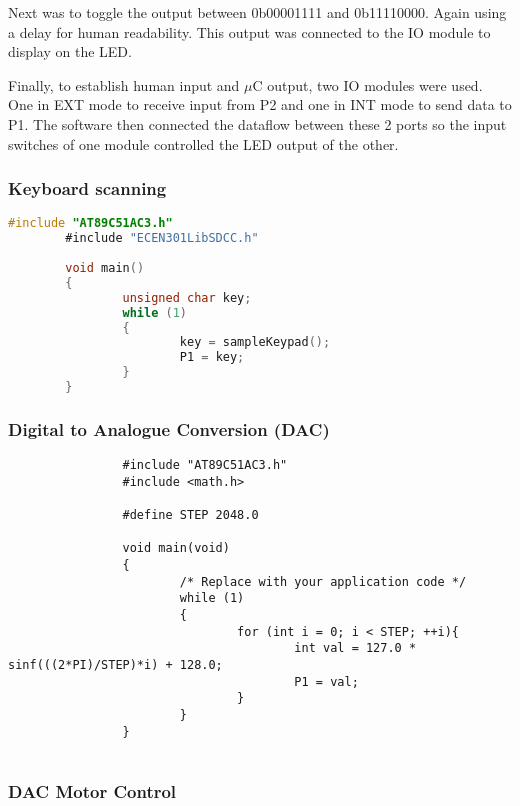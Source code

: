 \documentclass[11pt]{article}
\begin{document}
\begin{preview}
        Next was to toggle the output between 0b00001111 and 0b11110000. Again using a delay for human readability. This output was connected to the IO module to display on the LED.

        Finally, to establish human input and $\mu$C output, two IO modules were used. One in EXT mode to receive input from P2 and one in INT mode to send data to P1. The software then connected the dataflow between these 2 ports so the input switches of one module controlled the LED output of the other.


        \subsubsection{Keyboard scanning}

        \begin{lstlisting}[language=C]
        #include "AT89C51AC3.h"
        #include "ECEN301LibSDCC.h"
        
        void main()
        {
                unsigned char key;
                while (1)
                {
                        key = sampleKeypad();
                        P1 = key;
                }
        }
        \end{lstlisting}

        \subsubsection{Digital to Analogue Conversion (DAC)}

        \begin{lstlisting}
                #include "AT89C51AC3.h"
                #include <math.h>
                
                #define STEP 2048.0
                
                void main(void)
                {
                        /* Replace with your application code */
                        while (1)
                        {
                                for (int i = 0; i < STEP; ++i){
                                        int val = 127.0 * sinf(((2*PI)/STEP)*i) + 128.0;
                                        P1 = val;
                                }
                        }
                }
                        
        \end{lstlisting}

        \subsubsection{DAC Motor Control}

\end{preview}
\end{document}
